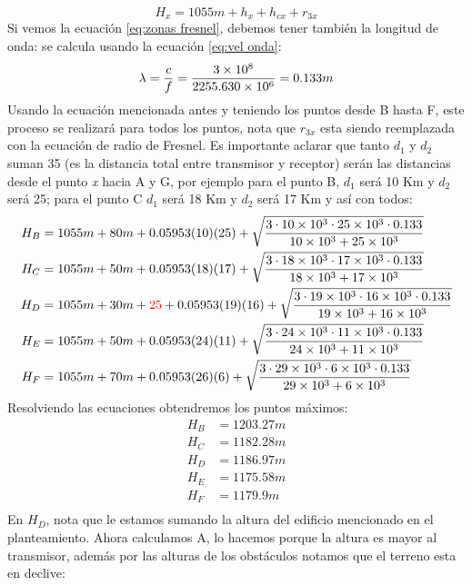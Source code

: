 \documentclass[
	12pt, %
	fleqn, %
	a4paper, %
	oneside, %
]{LegrandOrangeBook}
\begin{document}
\begin{example}
\begin{equation}
H_x=1055m+h_x+h_{cx}+r_{3x}
\end{equation}
Si vemos la ecuación \ref{eq:zonas fresnel}, debemos tener también la longitud de onda: se calcula usando la ecuación \ref{eq:vel onda}:
\begin{equation}
\lambda=\frac{c}{f}=\frac{3\times 10^{8}}{2255.630\times 10^{6}}=0.133m
\end{equation}
Usando la ecuación mencionada antes y teniendo los puntos desde B hasta F, este proceso se realizará para todos los puntos, nota que $r_{3x}$ esta siendo reemplazada con la ecuación de radio de Fresnel. Es importante aclarar que tanto $d_1$ y $d_2$ suman 35 (es la distancia total entre transmisor y receptor) serán las distancias desde el punto \textit{x} hacia A y G, por ejemplo para el punto B, $d_1$ será 10 Km y $d_2$ será 25; para el punto C $d_1$ será 18 Km y $d_2$ será 17 Km y así con todos:
\begin{align}
H_B&=1055m+80m+0.05953(10)(25)+\sqrt{\frac{3\cdot 10\times 10^{3}\cdot 25\times 10^{3}\cdot 0.133}{10\times 10^{3}+25 \times 10^{3}}}\\
H_C&=1055m+50m+0.05953(18)(17)+\sqrt{\frac{3\cdot 18\times 10^{3}\cdot 17\times 10^{3}\cdot 0.133}{18\times 10^{3}+17 \times 10^{3}}}\\
H_D&=1055m+30m+\textcolor{red}{25}+0.05953(19)(16)+\sqrt{\frac{3\cdot 19\times 10^{3}\cdot 16\times 10^{3}\cdot 0.133}{19\times 10^{3}+16 \times 10^{3}}}\\
H_E&=1055m+50m+0.05953(24)(11)+\sqrt{\frac{3\cdot 24\times 10^{3}\cdot 11\times 10^{3}\cdot 0.133}{24\times 10^{3}+11 \times 10^{3}}}\\
H_F&=1055m+70m+0.05953(26)(6)+\sqrt{\frac{3\cdot 29\times 10^{3}\cdot 6\times 10^{3}\cdot 0.133}{29\times 10^{3}+6 \times 10^{3}}}\\
\end{align}
Resolviendo las ecuaciones obtendremos los puntos máximos:
\begin{align}
H_B&=1203.27m\\
H_C&=1182.28 m\\
H_D&=1186.97 m\\
H_E&=1175.58 m\\
H_F&=1179.9 m\\
\end{align}
En $H_D$, nota que le estamos sumando la altura del edificio mencionado en el planteamiento. Ahora calculamos A, lo hacemos porque la altura es mayor al transmisor, además por las alturas de los obstáculos notamos que el terreno esta en declive:

\end{example}
\end{document}
